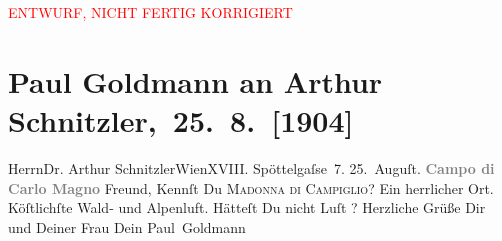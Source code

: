 
\begin{center}
            \textcolor{red}{ENTWURF, NICHT FERTIG KORRIGIERT}
                      \end{center}
            
         
         \renewcommand{\erwaehntePersonen}{Personen: Olga Schnitzler}
         \renewcommand{\erwaehnteOrte}{Orte: Alpen, Campo Carlo Magno, Edmund-Weiß-Gasse, Madonna di Campiglio, Wien}
         \renewcommand{\erwaehnteWerke}{}
               \section[ Paul Goldmann an Arthur Schnitzler, 25. 8. {[}1904{]}]{ Paul Goldmann an Arthur Schnitzler, 25. 8. {[}1904{]}}\nopagebreak{}\rehead{ }\begin{ledgroupsized}[t]{13cm}\normalsize\beginnumbering \toendnotes[C]{\smallbreak\pagebreak[2]} 
\toendnotes[C]{\smallbreak}\pstart{}{\pb}Herrn\pend{}\pstart{}Dr. Arthur Schnitzler\pend{}\pstart{}Wien\pend{}\pstart{}XVIII. Spöttelgaſse 7.\pend{}{\bigskip}\pstart
           \centering{}{\pb}25. Auguſt. \textcolor{gray}{\textbf{Campo di Carlo Magno}}\pend
           \pstart
           \label{K_L03452-1v}\label{K_L03452-1h} Freund, Kennſt Du \textsc{Madonna di Campiglio}? Ein herrlicher Ort. Köſtlichſte Wald- und Alpenluft. Hätteſt Du nicht Luſt \label{K_L03452-2v}\label{K_L03452-2h}? Herzliche Grüße Dir und Deiner Frau Dein \spacefill\mbox{Paul Goldmann}\pend
           
         
         \endnumbering{}\end{ledgroupsized}\begin{anhang}\end{anhang}\newcommand{\dateiname}{L03452}\newcommand{\titel}{Paul Goldmann an Arthur Schnitzler, 25. 8. [1904]}\newcommand{\editorInnen}{Martin Anton Müller und Laura Untner}
      